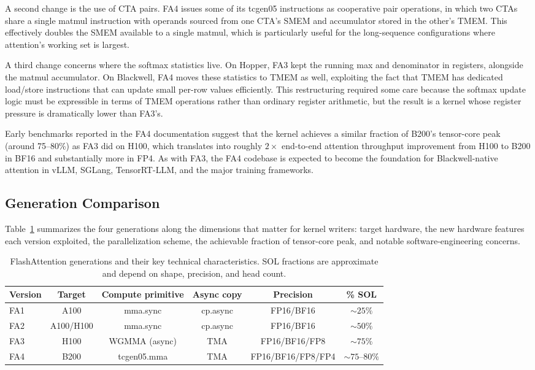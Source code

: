 \documentclass[10pt]{article}
\begin{document}
A second change is the use of CTA pairs. FA4 issues some of its tcgen05 instructions as cooperative pair operations, in which two CTAs share a single matmul instruction with operands sourced from one CTA's SMEM and accumulator stored in the other's TMEM. This effectively doubles the SMEM available to a single matmul, which is particularly useful for the long-sequence configurations where attention's working set is largest.

A third change concerns where the softmax statistics live. On Hopper, FA3 kept the running max and denominator in registers, alongside the matmul accumulator. On Blackwell, FA4 moves these statistics to TMEM as well, exploiting the fact that TMEM has dedicated load/store instructions that can update small per-row values efficiently. This restructuring required some care because the softmax update logic must be expressible in terms of TMEM operations rather than ordinary register arithmetic, but the result is a kernel whose register pressure is dramatically lower than FA3's.

Early benchmarks reported in the FA4 documentation suggest that the kernel achieves a similar fraction of B200's tensor-core peak (around 75--80\%) as FA3 did on H100, which translates into roughly $2\times$ end-to-end attention throughput improvement from H100 to B200 in BF16 and substantially more in FP4. As with FA3, the FA4 codebase is expected to become the foundation for Blackwell-native attention in vLLM, SGLang, TensorRT-LLM, and the major training frameworks.

\subsection{Generation Comparison}
\label{sec:fa-comparison}

Table~\ref{tab:fa-comparison} summarizes the four generations along the dimensions that matter for kernel writers: target hardware, the new hardware features each version exploited, the parallelization scheme, the achievable fraction of tensor-core peak, and notable software-engineering concerns.

\begin{table}[H]
\caption{FlashAttention generations and their key technical characteristics. SOL fractions are approximate and depend on shape, precision, and head count.}
\label{tab:fa-comparison}
\centering\small
\begin{tabular}{lccccc}
\toprule
Version & Target & Compute primitive & Async copy & Precision & \% SOL \\
\midrule
FA1 & A100 & mma.sync & cp.async & FP16/BF16 & $\sim 25\%$ \\
FA2 & A100/H100 & mma.sync & cp.async & FP16/BF16 & $\sim 50\%$ \\
FA3 & H100 & WGMMA (async) & TMA & FP16/BF16/FP8 & $\sim 75\%$ \\
FA4 & B200 & tcgen05.mma & TMA & FP16/BF16/FP8/FP4 & $\sim 75$--$80\%$ \\
\bottomrule
\end{tabular}
\end{table}
\end{document}
